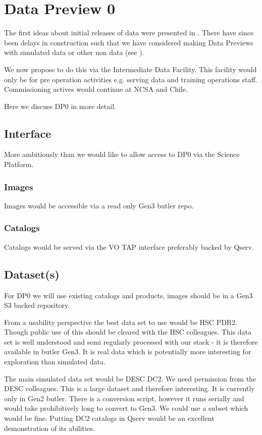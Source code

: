 \section{Data Preview 0}\label{sec:dp0}
The first ideas about initial releases of \RO data were presented in .
There have since been delays in construction such that we have considered making Data Previews with
simulated data or other non \RO data (see ).

We now propose to do this via the Intermediate Data Facility. This facility would only be for
pre operation activities e.g. serving data and training operations staff.
Commissioning actives would continue at NCSA and Chile.

Here we discuss DP0 in more detail.

\subsection {Interface}
More ambitiously than   we would like to allow access to DP0 via
the Science Platform.
\subsubsection{Images}
Images would be accessible via a read only Gen3 butler repo.
\subsubsection{Catalogs}
Catalogs would be served via the VO TAP interface preferably backed by Qserv.



\subsection {Dataset(s)} \label{sec:dataset}

For DP0 we will use existing catalogs and products, images should be in a Gen3 S3 backed repository.

From a usability perspective the best data set to use would be HSC PDR2. Though public use of
this should be cleared with the HSC colleagues. This data set is well understood and semi regularly processed with our stack - it is therefore available in butler Gen3. It is real data which is potentially
more interesting for exploration than simulated data.

The main simulated data set would be DESC DC2. We need permission from the DESC colleagues. This is a large dataset and therefore interesting. It is currently only in Gen2 butler. There is a conversion script, however it
runs serially and would take prohibitively long to convert to Gen3. We could use a subset which would be fine.  Putting DC2 catalogs in Qserv would be an excellent demonstration of its abilities.



